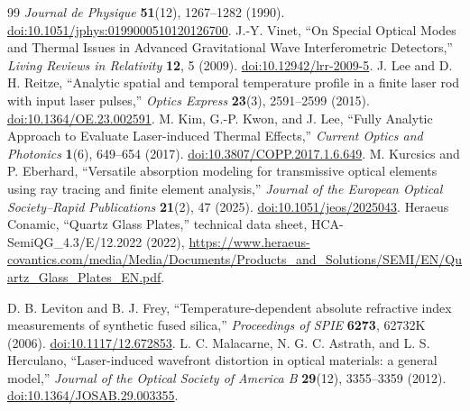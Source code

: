 \begin{thebibliography}{99}
\emph{Journal de Physique} \textbf{51}(12), 1267--1282 (1990).
\href{https://doi.org/10.1051/jphys:0199000510120126700}{doi:10.1051/jphys:0199000510120126700}.
J.-Y. Vinet,
``On Special Optical Modes and Thermal Issues in Advanced Gravitational Wave Interferometric Detectors,''
\emph{Living Reviews in Relativity} \textbf{12}, 5 (2009).
\href{https://doi.org/10.12942/lrr-2009-5}{doi:10.12942/lrr-2009-5}.
J. Lee and D. H. Reitze,
``Analytic spatial and temporal temperature profile in a finite laser rod with input laser pulses,''
\emph{Optics Express} \textbf{23}(3), 2591--2599 (2015).
\href{https://doi.org/10.1364/OE.23.002591}{doi:10.1364/OE.23.002591}.
M. Kim, G.-P. Kwon, and J. Lee,
``Fully Analytic Approach to Evaluate Laser-induced Thermal Effects,''
\emph{Current Optics and Photonics} \textbf{1}(6), 649--654 (2017).
\href{https://doi.org/10.3807/COPP.2017.1.6.649}{doi:10.3807/COPP.2017.1.6.649}.
M. Kurcsics and P. Eberhard,
``Versatile absorption modeling for transmissive optical elements using ray tracing and finite element analysis,''
\emph{Journal of the European Optical Society--Rapid Publications} \textbf{21}(2), 47 (2025).
\href{https://doi.org/10.1051/jeos/2025043}{doi:10.1051/jeos/2025043}.
Heraeus Conamic, ``Quartz Glass Plates,'' technical data sheet, HCA-SemiQG\_4.3/E/12.2022 (2022),
\url{https://www.heraeus-covantics.com/media/Media/Documents/Products_and_Solutions/SEMI/EN/Quartz_Glass_Plates_EN.pdf}.


D. B. Leviton and B. J. Frey,
``Temperature-dependent absolute refractive index measurements of synthetic fused silica,''
\emph{Proceedings of SPIE} \textbf{6273}, 62732K (2006).
\href{https://doi.org/10.1117/12.672853}{doi:10.1117/12.672853}.
L. C. Malacarne, N. G. C. Astrath, and L. S. Herculano,
``Laser-induced wavefront distortion in optical materials: a general model,''
\emph{Journal of the Optical Society of America B} \textbf{29}(12), 3355--3359 (2012).
\href{https://doi.org/10.1364/JOSAB.29.003355}{doi:10.1364/JOSAB.29.003355}.


\end{thebibliography}
